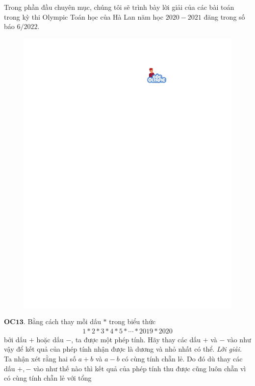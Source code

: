 \begin{multicols}{2}
	\setlength{\abovedisplayskip}{6pt}
	\setlength{\belowdisplayskip}{6pt}
	Trong phần đầu chuyên mục, chúng tôi sẽ trình bày lời giải của các bài toán trong kỳ thi Olympic Toán học của Hà Lan năm học $2020-2021$ đăng trong số báo $6/2022$. 
	\begin{figure}[H]
		\centering
		\vspace*{-5pt}
		\captionsetup{labelformat= empty, justification=centering}
		\includegraphics[width=0.9\linewidth]{gocolympic}
		\vspace*{-10pt}
	\end{figure}
	{\bf\color{cackithi} OC$\pmb{13.}$} Bằng cách thay mỗi dấu $\ast$ trong biểu thức
	\begin{align*}
		1 \ast  2 \ast 3  \ast 4 \ast 5 \ast \cdots \ast 2019 \ast 2020
	\end{align*}
	bởi dấu $+$ hoặc dấu $-$, ta được một phép tính. Hãy thay các dấu $+$ và $-$ vào như vậy để kết quả của phép tính nhận được là dương và nhỏ nhất có thể.
	\vskip 0.1cm
	\textit{Lời giải.} Ta nhận xét rằng hai số $a+b$ và $a-b$ có cùng tính chẵn lẻ. Do đó dù thay các dấu $+, -$ vào như thế nào thì kết quả của phép tính thu được cũng luôn chẵn vì có cùng tính chẵn lẻ với tổng

\end{multicols}
